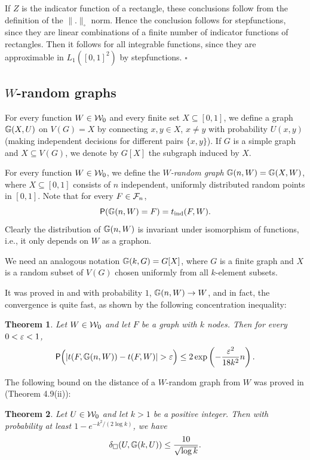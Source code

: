\documentclass{article}
\newtheorem{theorem}{Theorem}[section]
\newenvironment{proof}{\medskip\noindent{\bf Proof. }}{\hfill$\square$\medskip}
\begin{document}
\begin{proof}
If $Z$ is the indicator function of a rectangle, these conclusions
follow from the definition of the $\|.\|_\square$ norm. Hence the
conclusion follows for stepfunctions, since they are linear
combinations of a finite number of indicator functions of rectangles.
Then it follows for all integrable functions, since they are
approximable in $L_1([0,1]^2)$ by stepfunctions.
\end{proof}


\subsection{$W$-random graphs}\label{SEC:WRAND}

For every function $W\in \mathcal{W}_0$ and every finite set $X\subseteq
[0,1]$, we define a graph ${\mathbb G}(X,U)$ on $V(G)=X$ by connecting
$x,y\in X$, $x\not= y$ with probability $U(x,y)$ (making independent
decisions for different pairs $\{x,y\}$). If $G$ is a simple graph
and $X\subseteq V(G)$, we denote by $G[X]$ the subgraph induced by
$X$.

For every function $W\in \mathcal{W}_0$, we define the {\it $W$-random graph}
${\mathbb G}(n,W)={\mathbb G}(X,W)$, where $X\subseteq[0,1]$ consists of $n$
independent, uniformly distributed random points in $[0,1]$. Note
that for every $F\in\mathcal{F}_n$,
\[
{\sf P}({\mathbb G}(n,W)=F)=t_{\rm ind}(F,W).
\]
Clearly the distribution of ${\mathbb G}(n,W)$ is invariant under isomorphism
of functions, i.e., it only depends on $W$ as a graphon.

We need an analogous notation ${\mathbb G}(k,G)=G[X]$, where $G$ is a finite
graph and $X$ is a random subset of $V(G)$ chosen uniformly from all
$k$-element subsets.

It was proved in \cite{LSz} and with probability $1$, ${\mathbb G}(n,W)\to
W$, and in fact, the convergence is quite fast, as shown by the
following concentration inequality:

\begin{theorem}\label{CONC}
Let $W\in\mathcal{W}_0$ and let $F$ be a graph with $k$ nodes. Then for every
$0<\varepsilon<1$,
\begin{equation}\label{TFH}
{\sf P}\Bigl(|t(F,{\mathbb G}(n,W))-t(F,W)| > \varepsilon \Bigr) \le
2\exp\left(-\frac{\varepsilon^2}{18k^2}n\right).
\end{equation}
\end{theorem}

The following bound on the distance of a $W$-random graph from $W$
was proved in \cite{BCLSV1} (Theorem 4.9(ii)):

\begin{theorem}\label{THM:SAMPLE2}
Let $U\in\mathcal{W}_0$ and let $k>1$ be a positive integer. Then with
probability at least $1-e^{-k^2/(2\log k)}$, we have
\[
\delta_\square(U, {\mathbb G}(k,U))
\le \frac{10}{\sqrt{\log k}}.
\]
\end{theorem}
\end{document}
